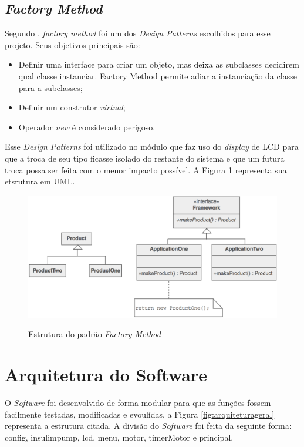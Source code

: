 \subsection{\emph{Factory Method}}
Segundo \cite{shalloway2004design}, \emph{factory method} foi um dos \emph{Design Patterns} escolhidos para esse projeto. Seus objetivos principais são:

\begin{itemize}
\item Definir uma interface para criar um objeto, mas deixa as subclasses decidirem qual classe instanciar. Factory Method permite adiar a instanciação da classe para a subclasses;
\item Definir um construtor \emph{virtual};
\item Operador \emph{new} é considerado perigoso.
\end{itemize}

Esse \emph{Design Patterns} foi utilizado no módulo que faz uso do \emph{display} de LCD para que a troca de seu tipo ficasse isolado do restante do sistema e que um futura troca possa ser feita com o menor impacto possível. A Figura \ref{fig:factorymethod} representa sua etsrutura em UML. \newpage

\begin{figure}[htp]
	\centering
	\includegraphics[scale=0.4]{images/Factory_Method.png}
	\caption{Estrutura do padrão \emph{Factory Method}}	
	\label{fig:factorymethod}
	\cite{shalloway2004design}
\end{figure}

\section{Arquitetura do Software}

O \emph{Software} foi desenvolvido de forma modular para que as funções fossem facilmente testadas, modificadas e evoulídas, a Figura \ref{fig:arquiteturageral} representa a estrutura citada. A divisão do \emph{Software} foi feita da seguinte forma: config, insulimpump, lcd, menu, motor, timerMotor e principal. 

